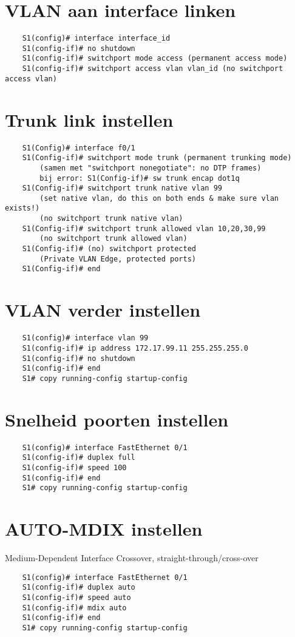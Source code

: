 \documentclass[10pt, a4paper]{article}
\begin{document}
	\section{VLAN aan interface linken}
	\begin{lstlisting}
	S1(config)# interface interface_id
	S1(config-if)# no shutdown
	S1(config-if)# switchport mode access (permanent access mode)
	S1(config-if)# switchport access vlan vlan_id (no switchport access vlan)
	\end{lstlisting}

	\section{Trunk link instellen}
	\begin{lstlisting}
	S1(Config)# interface f0/1
	S1(Config-if)# switchport mode trunk (permanent trunking mode)
		(samen met "switchport nonegotiate": no DTP frames)
		bij error: S1(Config-if)# sw trunk encap dot1q
	S1(Config-if)# switchport trunk native vlan 99
		(set native vlan, do this on both ends & make sure vlan exists!)
		(no switchport trunk native vlan)
	S1(Config-if)# switchport trunk allowed vlan 10,20,30,99
		(no switchport trunk allowed vlan)
	S1(Config-if)# (no) switchport protected
		(Private VLAN Edge, protected ports)
	S1(Config-if)# end
	\end{lstlisting}

	\section{VLAN verder instellen}
	\begin{lstlisting}
	S1(config)# interface vlan 99
	S1(config-if)# ip address 172.17.99.11 255.255.255.0
	S1(config-if)# no shutdown
	S1(config-if)# end
	S1# copy running-config startup-config
	\end{lstlisting}

	\section{Snelheid poorten instellen}
	\begin{lstlisting}
	S1(config)# interface FastEthernet 0/1
	S1(config-if)# duplex full
	S1(config-if)# speed 100
	S1(config-if)# end
	S1# copy running-config startup-config
	\end{lstlisting}

	\section{AUTO-MDIX instellen}
	Medium-Dependent Interface Crossover, straight-through/cross-over\\
	\begin{lstlisting}
	S1(config)# interface FastEthernet 0/1
	S1(config-if)# duplex auto
	S1(config-if)# speed auto
	S1(config-if)# mdix auto
	S1(config-if)# end
	S1# copy running-config startup-config
	\end{lstlisting}
\end{document}
